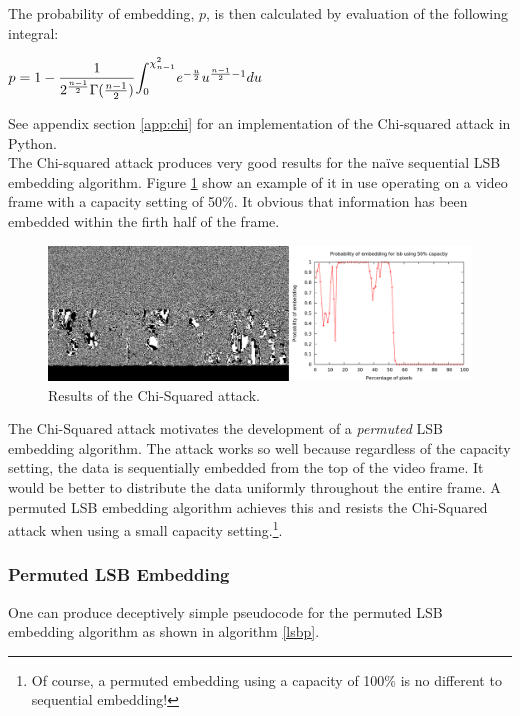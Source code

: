 \documentclass[paper=a4, fontsize=11pt,twoside]{scrartcl}
\numberwithin{table}{section}
\numberwithin{figure}{section}
\numberwithin{algorithm}{section}
\begin{document}
\noindent
The probability of embedding, $p$, is then calculated by evaluation of the following integral:
\begin{center}
$p = 1 - \dfrac{1}{2^{\frac{n-1}{2}} \Gamma (\frac{n-1}{2})} \mathlarger{\int}_{0}^{\chi ^{2} _{n-1}} e^{-\frac{u}{2}}u^{\frac{n-1}{2}-1} du$
\end{center}

\noindent
See appendix section \ref{app:chi} for an implementation of the Chi-squared attack in Python.\\

\noindent
The Chi-squared attack produces very good results for the na\"ive sequential LSB embedding algorithm. Figure \ref{chi} show an example of it in use operating on a video frame with a capacity setting of 50\%. It obvious that information has been embedded within the firth half of the frame.\\

\begin{figure}[here]
\centerline{\includegraphics[width=\textwidth]{images/chi_graph.png}}
\caption{Results of the Chi-Squared attack.}
\label{chi}
\end{figure}

\noindent
The Chi-Squared attack motivates the development of a \textit{permuted} LSB embedding algorithm. The attack works so well because regardless of the capacity setting, the data is sequentially embedded from the top of the video frame. It would be better to distribute the data uniformly throughout the entire frame. A permuted LSB embedding algorithm achieves this and resists the Chi-Squared attack when using a small capacity setting.\footnote{Of course, a permuted embedding using a capacity of 100\% is no different to sequential embedding!}.

\subsubsection{Permuted LSB Embedding}

One can produce deceptively simple pseudocode for the permuted LSB embedding algorithm as shown in algorithm \ref{lsbp}.
\end{document}
